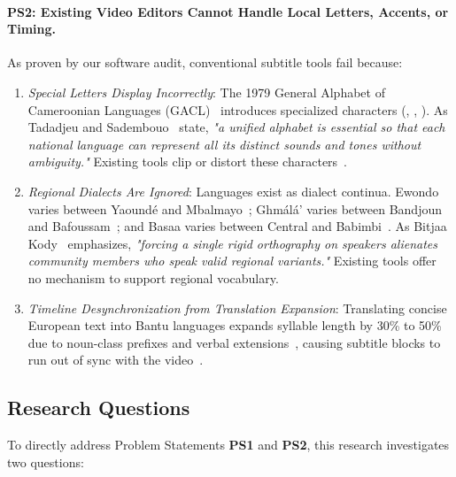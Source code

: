 \documentclass[a4paper,11pt]{article}
\begin{document}
\paragraph{\textbf{PS2: Existing Video Editors Cannot Handle Local Letters, Accents, or Timing.}}
As proven by our software audit, conventional subtitle tools fail because:
\begin{enumerate}
    \item \textit{Special Letters Display Incorrectly}: The 1979 General Alphabet of Cameroonian Languages (GACL)~\cite{tadadjeu1979alphabet} introduces specialized characters (\textopeno, \textschwa, \textipa{\ng}). As Tadadjeu and Sadembouo~\cite{tadadjeu1979alphabet} state, \textit{"a unified alphabet is essential so that each national language can represent all its distinct sounds and tones without ambiguity."} Existing tools clip or distort these characters~\cite{w3c2019webvtt}.
    \item \textit{Regional Dialects Are Ignored}: Languages exist as dialect continua. Ewondo varies between Yaound\'e and Mbalmayo~\cite{essono2010ewondo, redden2018ewondo}; Gh\textopeno m\'al\'a' varies between Bandjoun and Bafoussam~\cite{kamga2021phonetic}; and Basaa varies between Central and Babimbi~\cite{bitjaa2017dialectologie}. As Bitjaa Kody~\cite{bitjaa2017dialectologie} emphasizes, \textit{"forcing a single rigid orthography on speakers alienates community members who speak valid regional variants."} Existing tools offer no mechanism to support regional vocabulary.
    \item \textit{Timeline Desynchronization from Translation Expansion}: Translating concise European text into Bantu languages expands syllable length by 30\% to 50\% due to noun-class prefixes and verbal extensions~\cite{abega2012langues}, causing subtitle blocks to run out of sync with the video~\cite{won2025endtoend}.
\end{enumerate}

\subsection{Research Questions}
\label{sec:chap1_research_questions}

To directly address Problem Statements \textbf{PS1} and \textbf{PS2}, this research investigates two questions:
\end{document}
